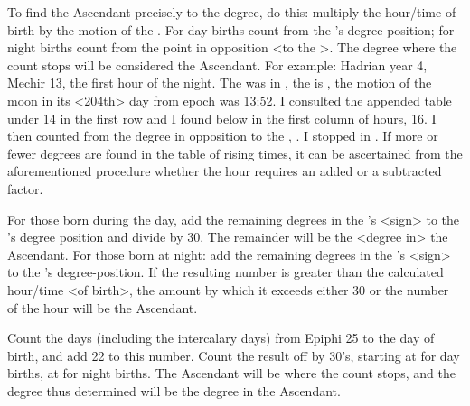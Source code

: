 To find the Ascendant precisely to the degree, do this: multiply the hour/time of birth by the motion of the \Moon. For day births count from the \Sun’s degree-position; for night births count from the point in opposition <to the \Sun>. The degree where the count stops will be considered the Ascendant. For example: Hadrian year 4, Mechir 13, the first hour of the night. The \Sun\xspace was in \Aquarius\xspace 22\deg, the \Moon\xspace is
\Scorpio\xspace 7\deg, the motion of the moon in its <204th> day from epoch was 13;52\deg. I consulted the appended
table under 14 in the first row and I found below in the first column of hours, 16. I then counted from the degree in opposition to the \Sun, \Leo\xspace 22\deg. I stopped in \deg. If more or fewer degrees are found in the table of rising times, it can be ascertained from the aforementioned procedure whether the hour requires an added or a subtracted factor.

For those born during the day, add the remaining degrees in the \Sun’s <sign> to the \Moon’s degree position and divide by 30. The remainder will be the <degree in> the Ascendant. For those born at night: add the remaining degrees in the \Moon’s <sign> to the \Sun’s degree-position. If the resulting number is
greater than the calculated hour/time <of birth>, the amount by which it exceeds either 30 or the number of the hour will be the Ascendant.

Count the days (including the intercalary days) from Epiphi 25 to the day of birth, and add 22 to this number. Count the result off by 30’s, starting at \Cancer\xspace for day births, at \Capricorn\xspace for night births. The Ascendant will be where the count stops, and the degree thus determined will be the degree in the Ascendant.

\newpage